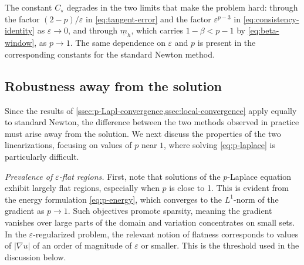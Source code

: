 \documentclass[11pt,pdflatex,sn-mathphys-num]{sn-jnl}
\theoremstyle{thmstyleone}%
\theoremstyle{thmstyletwo}%
\theoremstyle{thmstylethree}%
\begin{document}
The constant $C_\star$ degrades in the two limits that make the problem hard: through the factor $(2-p)/\varepsilon$ in \eqref{eq:tangent-error} and the factor $\varepsilon^{p-3}$ in \eqref{eq:consistency-identity} as $\varepsilon\to0$, and through $\underline m_h$, which carries $1-\beta<p-1$ by \eqref{eq:beta-window}, as $p\to1$. The same dependence on $\varepsilon$ and $p$ is present in the corresponding constants for the standard Newton method.

\subsection{Robustness away from the solution}
\label{ssec:robustness}
Since the results of \cref{ssec:p-Lapl-convergence,ssec:local-convergence} apply equally to standard Newton, the difference between the two methods observed in practice must arise away from the solution.
We next discuss the properties of the two linearizations, focusing on values of $p$ near $1$, where solving \eqref{eq:p-laplace} is particularly difficult.

\noindent
\emph{Prevalence of $\varepsilon$-flat regions.}
First, note that solutions of the $p$-Laplace equation exhibit largely flat regions, especially when $p$ is close to 1. This is evident from the energy formulation \eqref{eq:p-energy}, which converges to the $L^1$-norm of the gradient as $p\to 1$. Such objectives promote sparsity, meaning the gradient vanishes over large parts of the domain and variation concentrates on small sets. In the $\varepsilon$-regularized problem, the relevant notion of flatness corresponds to values of $|\nabla u|$ of an order of magnitude of $\varepsilon$ or smaller. %
This is the threshold used in the discussion below.
\end{document}
